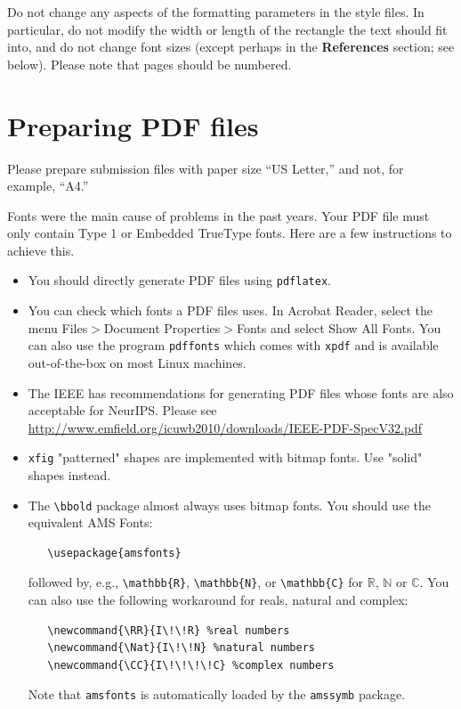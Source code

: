 \documentclass{article}
\begin{document}
Do not change any aspects of the formatting parameters in the style files.  In
particular, do not modify the width or length of the rectangle the text should
fit into, and do not change font sizes (except perhaps in the
\textbf{References} section; see below). Please note that pages should be
numbered.

\section{Preparing PDF files}

Please prepare submission files with paper size ``US Letter,'' and not, for
example, ``A4.''

Fonts were the main cause of problems in the past years. Your PDF file must only
contain Type 1 or Embedded TrueType fonts. Here are a few instructions to
achieve this.

\begin{itemize}

\item You should directly generate PDF files using \verb+pdflatex+.

\item You can check which fonts a PDF files uses.  In Acrobat Reader, select the
  menu Files$>$Document Properties$>$Fonts and select Show All Fonts. You can
  also use the program \verb+pdffonts+ which comes with \verb+xpdf+ and is
  available out-of-the-box on most Linux machines.

\item The IEEE has recommendations for generating PDF files whose fonts are also
  acceptable for NeurIPS. Please see
  \url{http://www.emfield.org/icuwb2010/downloads/IEEE-PDF-SpecV32.pdf}

\item \verb+xfig+ "patterned" shapes are implemented with bitmap fonts.  Use
  "solid" shapes instead.

\item The \verb+\bbold+ package almost always uses bitmap fonts.  You should use
  the equivalent AMS Fonts:
\begin{verbatim}
   \usepackage{amsfonts}
\end{verbatim}
followed by, e.g., \verb+\mathbb{R}+, \verb+\mathbb{N}+, or \verb+\mathbb{C}+
for $\mathbb{R}$, $\mathbb{N}$ or $\mathbb{C}$.  You can also use the following
workaround for reals, natural and complex:
\begin{verbatim}
   \newcommand{\RR}{I\!\!R} %real numbers
   \newcommand{\Nat}{I\!\!N} %natural numbers
   \newcommand{\CC}{I\!\!\!\!C} %complex numbers
\end{verbatim}
Note that \verb+amsfonts+ is automatically loaded by the \verb+amssymb+ package.

\end{itemize}
\end{document}
